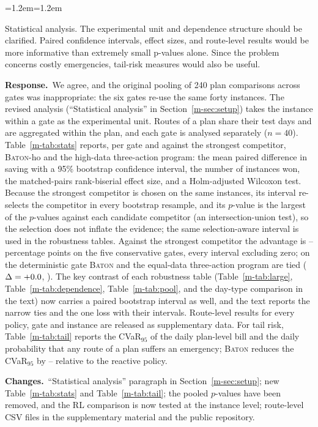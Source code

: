 \documentclass[11pt]{article}
\newenvironment{comment}{\par\medskip\noindent\color{rev}\itshape
  \begin{list}{}{\leftmargin=1.2em\rightmargin=1.2em}\item[]}%
  {\end{list}\par}
\newcommand{\resp}{\par\noindent\textbf{Response.}\ }
\newcommand{\chg}{\par\noindent\textbf{Changes.}\ }
\newcommand{\sref}[1]{Section~\ref{m-#1}}
\newcommand{\tref}[1]{Table~\ref{m-#1}}
\newcommand{\BATON}{\textsc{Baton}}
\begin{document}
\begin{comment}
Statistical analysis. The experimental unit and dependence structure
should be clarified. Paired confidence intervals, effect sizes, and
route-level results would be more informative than extremely small
p-values alone. Since the problem concerns costly emergencies, tail-risk
measures would also be useful.
\end{comment}
\resp We agree, and the original pooling of 240 plan comparisons across
gates was inappropriate: the six gates re-use the same forty instances.
The revised analysis (``Statistical analysis'' in \sref{sec:setup})
takes the instance within a gate as the experimental unit. Routes of a
plan share their test days and are aggregated within the plan, and each
gate is analysed separately ($n = 40$). \tref{tab:stats} reports, per
gate and against the strongest competitor, \BATON-ho and the high-data
three-action program: the mean paired difference in saving with a 95\%
bootstrap confidence interval, the number of instances won, the
matched-pairs rank-biserial effect size, and a Holm-adjusted Wilcoxon
test. Because the strongest competitor is chosen on the same instances,
its interval re-selects the competitor in every bootstrap resample, and
its $p$-value is the largest of the $p$-values against each candidate
competitor (an intersection-union test), so the selection does not
inflate the evidence; the same selection-aware interval is used in the
robustness tables. Against the strongest competitor the advantage is
\statConsDeltaMin--\statConsDeltaMax{} percentage points on the five
conservative gates, every interval excluding zero; on the deterministic
gate \BATON{} and the equal-data three-action program are tied
($\Delta = +0.0$, \statDetCI). The key contrast of each
robustness table (\tref{tab:large}, \tref{tab:dependence},
\tref{tab:pool}, and the day-type comparison in the text) now carries a
paired bootstrap interval as well, and the text reports the narrow ties
and the one loss with their intervals. Route-level results for every policy, gate
and instance are released as supplementary data. For tail risk,
\tref{tab:tail} reports the CVaR$_{95}$ of the daily plan-level bill
and the daily probability that any route of a plan suffers an
emergency; \BATON{} reduces the CVaR$_{95}$ by
\tailBatonLo--\tailBatonHi{} relative to the reactive policy.
\chg ``Statistical analysis'' paragraph in \sref{sec:setup}; new
\tref{tab:stats} and \tref{tab:tail}; the pooled $p$-values have been
removed, and the RL comparison is now tested at the instance level;
route-level CSV files in the supplementary material and the public
repository.
\end{document}
